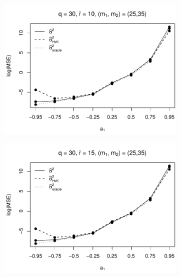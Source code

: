 \begin{figure}[p]
\begin{subfigure}[b]{0.45\textwidth}
\includegraphics[width=\textwidth]{Plots/Robustness/MSE_lrv_T=500_slope=1_(q,K1,K2,M1,M2)=(30,2,10,25,35).pdf}
\end{subfigure}
\hspace{0.25cm}
\begin{subfigure}[b]{0.45\textwidth}
\includegraphics[width=\textwidth]{Plots/Robustness/MSE_lrv_T=500_slope=1_(q,K1,K2,M1,M2)=(30,2,15,25,35).pdf}
\end{subfigure}


\end{figure}
